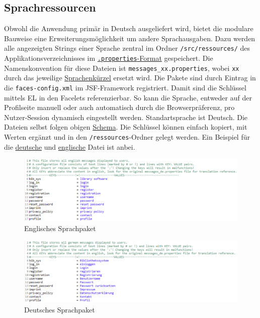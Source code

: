 \documentclass{article}
\begin{document}
\subsection{Sprachressourcen}
\indent Obwohl die Anwendung primär in Deutsch ausgeliefert wird, bietet die modulare Bauweise eine Erweiterungsmöglichkeit um andere Sprachausgaben. Dazu werden alle angezeigten Strings einer Sprache zentral im Ordner \texttt{/src/ressources/} des Applikationsverzeichnisses im \hyperlink{https://de.wikipedia.org/wiki/Java-Properties-Datei}{\texttt{.properties}-Format} gespeichert. Die Namenskonvention für diese Dateien ist \texttt{messages\_xx.properties}, wobei \texttt{xx} durch das jeweilige \hyperlink{https://de.wikipedia.org/wiki/Liste_der_ISO-639-1-Codes}{Sprachenkürzel} ersetzt wird. Die Pakete sind durch Eintrag in die \texttt{faces-config.xml} im JSF-Framework registriert. Damit sind die Schlüssel mittels EL in den Facelets referenzierbar. So kann die Sprache, entweder auf der Profilseite manuell oder auch automatisch durch die Browserpräferenz, pro Nutzer-Session dynamisch eingestellt werden. Standartsprache ist Deutsch. Die Dateien selbst folgen obigen \hyperlink{propSchema}{Schema}. Die Schlüssel können einfach kopiert, mit Werten ergänzt und in den \texttt{/ressources}-Ordner gelegt werden. Ein Beispiel für die \hyperlink{messagesde}{deutsche} und \hyperlink{messagesen}{englische} Datei ist anbei.

\begin{figure}
\hypertarget{messagesen}{}
\centering
\includegraphics[width=60em]{messagesen}
\caption{Englisches Sprachpaket}
\end{figure}

\begin{figure}
\hypertarget{messagesde}{}
\centering
\includegraphics[width=60em]{messagesde}
\caption{Deutsches Sprachpaket}
\end{figure}
\restoregeometry
\end{document}
